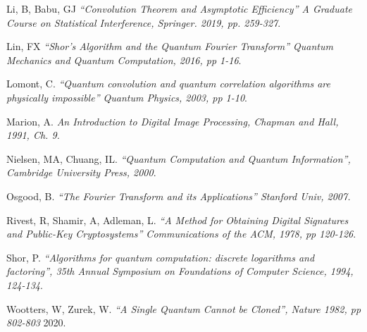 \documentclass[a4paper,11pt]{article}
\theoremstyle{mytheor}
\begin{document}
\begin{thebibliography}{9}
Li, B, Babu, GJ
\textit{“Convolution Theorem and Asymptotic Efficiency” A Graduate Course on Statistical Interference, Springer. 2019, pp. 259-327}.

Lin, FX
\textit{“Shor’s Algorithm and the Quantum Fourier Transform” Quantum Mechanics and Quantum Computation, 2016, pp 1-16}.

Lomont, C.
\textit{“Quantum convolution and quantum correlation algorithms are physically impossible”  Quantum Physics, 2003, pp 1-10}.

Marion, A.
\textit{An Introduction to Digital Image Processing, Chapman and Hall, 1991, Ch. 9.}

Nielsen, MA, Chuang, IL.
\textit{“Quantum Computation and Quantum Information”, Cambridge University Press, 2000}.

Osgood, B.
\textit{“The Fourier Transform and its Applications” Stanford Univ, 2007.}

Rivest, R, Shamir, A, Adleman, L.
\textit{“A Method for Obtaining Digital Signatures and Public-Key Cryptosystems” Communications of the ACM, 1978, pp 120-126}.

Shor, P.
\textit{“Algorithms for quantum computation: discrete logarithms and factoring”, 35th Annual Symposium on Foundations of Computer Science, 1994, 124-134}.

Wootters, W, Zurek, W.
\textit{“A Single Quantum Cannot be Cloned”, Nature 1982, pp 802-803}
2020.

\end{thebibliography}
\end{document}
